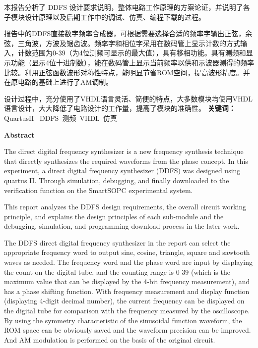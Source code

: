 \documentclass[12pt]{article}
\begin{document}
本报告分析了 DDFS 设计要求说明，整体电路工作原理的方案论证，并说明了各子模块设计原理以及后期工作中的调试、仿真、编程下载的过程。\par
报告中的DDFS直接数字频率合成器，可根据需要选择合适的频率字输出正弦，余弦，三角波，方波及锯齿波。频率字和相位字采用在数码管上显示计数的方式输入，计数范围为0-39（为4位测频可显示的最大值），具有移相功能。具有测频和显示功能（显示4位十进制数），能在数码管上显示当前频率以供和示波器测得的频率比较。利用正弦函数波形对称性特点，能明显节省ROM空间，提高波形精度。并在原电路的基础上进行了AM调制。\par
设计过程中，充分使用了VHDL语言灵活、简便的特点，大多数模块均使用VHDL语言设计，大大降低了电路设计的工作量，提高了模块的准确性。\newline\newline
\textbf{关键词：}QuartusII \ DDFS\ 
测频\ 
VHDL\ 
仿真
\newpage
\thispagestyle{empty}
\begin{center}\textbf{Abstract}\end{center}\par
The direct digital frequency synthesizer is a new frequency synthesis technique that directly synthesizes the required waveforms from the phase concept. In this experiment, a direct digital frequency synthesizer (DDFS) was designed using quartus II. Through simulation, debugging, and finally downloaded to the verification function on the SmartSOPC experimental system.


This report analyzes the DDFS design requirements, the overall circuit working principle, and explains the design principles of each sub-module and the debugging, simulation, and programming download process in the later work.


The DDFS direct digital frequency synthesizer in the report can select the appropriate frequency word to output sine, cosine, triangle, square and sawtooth waves as needed. The frequency word and the phase word are input by displaying the count on the digital tube, and the counting range is 0-39 (which is the maximum value that can be displayed by the 4-bit frequency measurement), and has a phase shifting function. With frequency measurement and display function (displaying 4-digit decimal number), the current frequency can be displayed on the digital tube for comparison with the frequency measured by the oscilloscope. By using the symmetry characteristic of the sinusoidal function waveform, the ROM space can be obviously saved and the waveform precision can be improved. And AM modulation is performed on the basis of the original circuit.
\end{document}
